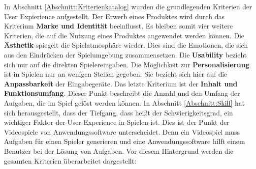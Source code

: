 In Abschnitt \ref{Abschnitt:Kriterienkatalog} wurden die grundlegenden Kriterien der User Expierience aufgestellt. Der Erwerb eines Produktes wird durch das Kriterium \textbf{Marke und Identität} beeinflusst. Es bleiben somit vier weitere Kriterien, die auf die Nutzung eines Produktes angewendet werden können. Die \textbf{Ästhetik} spiegelt die Spielatmosphäre wieder. Dies sind die Emotionen, die sich aus den Eindrücken der Spielumgebung zusammensetzen. Die \textbf{Usability} bezieht sich nur auf die direkten Spielereingaben. Die Möglichkeit zur \textbf{Personalisierung} ist in Spielen nur an wenigen Stellen gegeben. Sie bezieht sich hier auf die \textbf{Anpassbarkeit} der Eingabegeräte. Das letzte Kriterium ist der \textbf{Inhalt und Funktionsumfang}. Dieser Punkt beschreibt die Anzahl und den Umfang der Aufgaben, die im Spiel gelöst werden können. In Abschnitt \ref{Abschnitt:Skill} hat sich herausgestellt, dass der Tiefgang, dass heißt der Schwierigkeitsgrad, ein wichtiger Faktor der User Experience in Spielen ist. Dies ist der Punkt der Videospiele von Anwendungssoftware unterscheidet. Denn ein Videospiel muss Aufgaben für einen Spieler generieren und eine Anwendungssoftware hilft einem Benutzer bei der Lösung von Aufgaben. Vor diesem Hintergrund werden die gesamten Kriterien überarbeitet dargestellt: 







